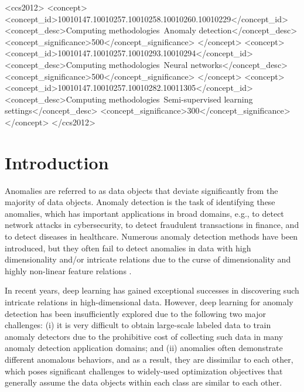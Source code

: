 \documentclass[sigconf]{acmart}
\begin{document}
\begin{CCSXML}
<ccs2012>
<concept>
<concept_id>10010147.10010257.10010258.10010260.10010229</concept_id>
<concept_desc>Computing methodologies~Anomaly detection</concept_desc>
<concept_significance>500</concept_significance>
</concept>
<concept>
<concept_id>10010147.10010257.10010293.10010294</concept_id>
<concept_desc>Computing methodologies~Neural networks</concept_desc>
<concept_significance>500</concept_significance>
</concept>
<concept>
<concept_id>10010147.10010257.10010282.10011305</concept_id>
<concept_desc>Computing methodologies~Semi-supervised learning settings</concept_desc>
<concept_significance>300</concept_significance>
</concept>
</ccs2012>
\end{CCSXML}




\maketitle

\section{Introduction}

Anomalies are referred to as data objects that deviate significantly from the majority of data objects. Anomaly detection is the task of identifying these anomalies, which has important applications in broad domains, e.g., to detect network attacks in cybersecurity, to detect fraudulent transactions in finance, and to detect diseases in healthcare. Numerous anomaly detection methods have been introduced, but they often fail to detect anomalies in data with high dimensionality and/or intricate relations due to the curse of dimensionality and highly non-linear feature relations \cite{ruff2018deepsvdd,pang2018repen}. 

In recent years, deep learning \cite{lecun2015deep} has gained exceptional successes in discovering such intricate relations in high-dimensional data. However, deep learning for anomaly detection has been insufficiently explored due to the following two major challenges: (i) it is very difficult to obtain large-scale labeled data to train anomaly detectors due to the prohibitive cost of collecting such data in many anomaly detection application domains; and (ii) anomalies often demonstrate different anomalous behaviors, and as a result, they are dissimilar to each other, which poses significant challenges to widely-used optimization objectives that generally assume the data objects within each class are similar to each other. 
\end{document}
